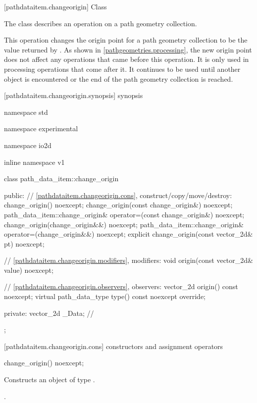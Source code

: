  [pathdataitem.changeorigin] {Class }

\pnum
{}
The class  describes an operation on a path geometry collection.

\pnum
This operation changes the origin point for a path geometry collection to be the value returned by . As shown in \ref{pathgeometries.processing}, the new origin point does not affect any operations that came before this operation. It is only used in processing operations that come after it. It continues to be used until another  object is encountered or the end of the path geometry collection is reached.

 [pathdataitem.changeorigin.synopsis] { synopsis}

\begin{codeblock}
namespace std { namespace experimental { namespace io2d { inline namespace v1 {
  class path_data_item::change_origin {
  public:
    // \ref{pathdataitem.changeorigin.cons}, construct/copy/move/destroy:
    change_origin() noexcept;
    change_origin(const change_origin&) noexcept;
    path_data_item::change_origin& operator=(const change_origin&) noexcept;
    change_origin(change_origin&&) noexcept;
    path_data_item::change_origin& operator=(change_origin&&) noexcept;
    explicit change_origin(const vector_2d& pt) noexcept;

    // \ref{pathdataitem.changeorigin.modifiers}, modifiers:
    void origin(const vector_2d& value) noexcept;

    // \ref{pathdataitem.changeorigin.observers}, observers:
    vector_2d origin() const noexcept;
    virtual path_data_type type() const noexcept override;
    
  private:
    vector_2d _Data; // \expos
  };
} } } }
\end{codeblock}

 [pathdataitem.changeorigin.cons] { constructors and assignment operators}

\begin{itemdecl}
    change_origin() noexcept;
\end{itemdecl}
\begin{itemdescr}
	\pnum
	\effects
	Constructs an object of type .
	
	\pnum
	\postconditions
	.
\end{itemdescr}

